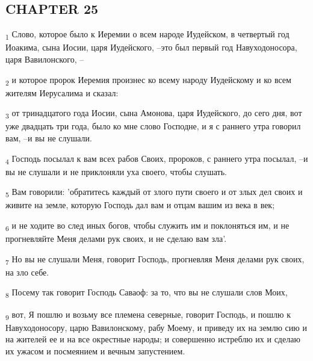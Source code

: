 \subsection{CHAPTER 25}
\begin{tcolorbox}
\textsubscript{1} Слово, которое было к Иеремии о всем народе Иудейском, в четвертый год Иоакима, сына Иосии, царя Иудейского, --это был первый год Навуходоносора, царя Вавилонского, --
\end{tcolorbox}
\begin{tcolorbox}
\textsubscript{2} и которое пророк Иеремия произнес ко всему народу Иудейскому и ко всем жителям Иерусалима и сказал:
\end{tcolorbox}
\begin{tcolorbox}
\textsubscript{3} от тринадцатого года Иосии, сына Амонова, царя Иудейского, до сего дня, вот уже двадцать три года, было ко мне слово Господне, и я с раннего утра говорил вам, --и вы не слушали.
\end{tcolorbox}
\begin{tcolorbox}
\textsubscript{4} Господь посылал к вам всех рабов Своих, пророков, с раннего утра посылал, --и вы не слушали и не приклоняли уха своего, чтобы слушать.
\end{tcolorbox}
\begin{tcolorbox}
\textsubscript{5} Вам говорили: 'обратитесь каждый от злого пути своего и от злых дел своих и живите на земле, которую Господь дал вам и отцам вашим из века в век;
\end{tcolorbox}
\begin{tcolorbox}
\textsubscript{6} и не ходите во след иных богов, чтобы служить им и поклоняться им, и не прогневляйте Меня делами рук своих, и не сделаю вам зла'.
\end{tcolorbox}
\begin{tcolorbox}
\textsubscript{7} Но вы не слушали Меня, говорит Господь, прогневляя Меня делами рук своих, на зло себе.
\end{tcolorbox}
\begin{tcolorbox}
\textsubscript{8} Посему так говорит Господь Саваоф: за то, что вы не слушали слов Моих,
\end{tcolorbox}
\begin{tcolorbox}
\textsubscript{9} вот, Я пошлю и возьму все племена северные, говорит Господь, и пошлю к Навуходоносору, царю Вавилонскому, рабу Моему, и приведу их на землю сию и на жителей ее и на все окрестные народы; и совершенно истреблю их и сделаю их ужасом и посмеянием и вечным запустением.
\end{tcolorbox}
